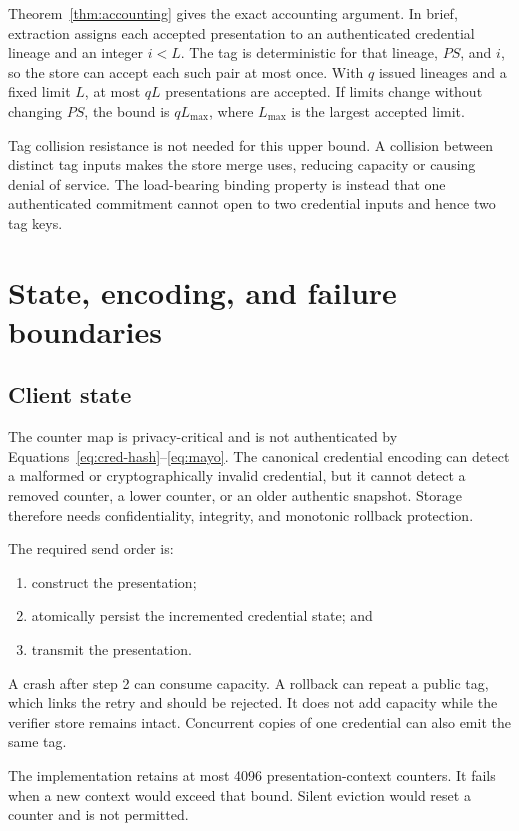 \documentclass[11pt]{article}
\theoremstyle{remark}
\begin{document}
Theorem~\ref{thm:accounting} gives the exact accounting argument. In brief,
extraction assigns each accepted presentation to an authenticated credential
lineage and an integer $i<L$. The tag is deterministic for that lineage,
$PS$, and $i$, so the store can accept each such pair at most once. With $q$
issued lineages and a fixed limit $L$, at most $qL$ presentations are
accepted. If limits change without changing $PS$, the bound is
$qL_{\max}$, where $L_{\max}$ is the largest accepted limit.

Tag collision resistance is not needed for this upper bound. A collision
between distinct tag inputs makes the store merge uses, reducing capacity or
causing denial of service. The load-bearing binding property is instead that
one authenticated commitment cannot open to two credential inputs and hence
two tag keys.

\section{State, encoding, and failure boundaries}

\subsection{Client state}

The counter map is privacy-critical and is not authenticated by
Equations~\eqref{eq:cred-hash}--\eqref{eq:mayo}. The canonical credential
encoding can detect a malformed or cryptographically invalid credential, but
it cannot detect a removed counter, a lower counter, or an older authentic
snapshot. Storage therefore needs confidentiality, integrity, and monotonic
rollback protection.

The required send order is:
\begin{enumerate}
  \item construct the presentation;
  \item atomically persist the incremented credential state; and
  \item transmit the presentation.
\end{enumerate}
A crash after step 2 can consume capacity. A rollback can repeat a public tag,
which links the retry and should be rejected. It does not add capacity while
the verifier store remains intact. Concurrent copies of one credential can
also emit the same tag.

The implementation retains at most 4096 presentation-context counters. It
fails when a new context would exceed that bound. Silent eviction would reset
a counter and is not permitted.
\end{document}
